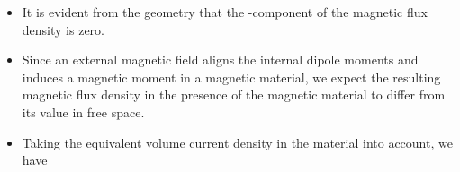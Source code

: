 \begin{ELjoin}
\begin{ELexample}{}
\begin{ELsolution}
\begin{itemize}
\tightlist
\item
  It is evident from the geometry that the -component of the magnetic flux density is zero.
\end{itemize}


\end{ELsolution}

\end{ELexample}

\end{ELjoin}

\ELhold


\begin{ELunit}


\end{ELunit}

\ELhold


\begin{ELunit}

\begin{itemize}
\tightlist
\item
  Since an external magnetic field aligns the internal dipole moments and induces a magnetic moment in a magnetic material, we expect the resulting magnetic flux density in the presence of the magnetic material to differ from its value in free space.
\item
  Taking the equivalent volume current density in the material into account, we have
\end{itemize}


\end{ELunit}

